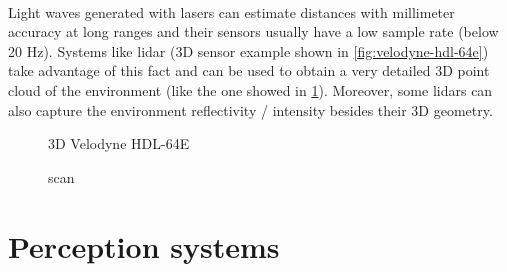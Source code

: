 \paragraph{}

Light waves generated with lasers can estimate distances with millimeter accuracy at long ranges and their sensors usually have a low sample rate (below 20 Hz). Systems like \gls{lidar} (3D sensor example shown in \cref{fig:velodyne-hdl-64e}) take advantage of this fact and can be used to obtain a very detailed 3D point cloud of the environment (like the one showed in \cref{fig:lidar-scan}). Moreover, some \glspl{lidar} can also capture the environment reflectivity / intensity besides their 3D geometry.

\begin{figure}[H]
	\begin{floatrow}[2]
		{\caption[3D Velodyne HDL-64E]{3D Velodyne HDL-64E\protect\footnotemark}\label{fig:velodyne-hdl-64e}}

		{\caption[ scan]{ scan\protect\footnotemark}\label{fig:lidar-scan}}
	\end{floatrow}
\end{figure}


\section{Perception systems}

